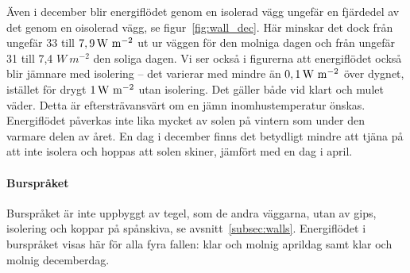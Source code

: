 Även i december blir energiflödet genom en isolerad vägg ungefär en fjärdedel av det 
genom en oisolerad vägg, se figur~\ref{fig:wall_dec}. Här minskar det dock från ungefär 33 
till $\unit[7,9]{W~m^{-2}}$ ut ur väggen för den molniga dagen och från ungefär 31 till 7,4 $\unit{W~m^{-2}}$ den soliga dagen. Vi ser också i figurerna att energiflödet också blir 
jämnare med isolering – det varierar med mindre än $\unit[0,1]{W~m^{-2}}$ över dygnet, 
istället för drygt $\unit[1]{W~m^{-2}}$ utan isolering. Det gäller både vid klart och mulet väder. Detta är eftersträvansvärt om en jämn inomhustemperatur önskas. Energiflödet påverkas inte lika mycket av solen på vintern som under den varmare delen av året. En dag i december finns det betydligt mindre att tjäna på att inte isolera och hoppas att solen skiner, jämfört med en dag i april.

\paragraph{Burspråket}

Burspråket är inte uppbyggt av tegel, som de andra väggarna, utan av gips, isolering och koppar på spånskiva, se avsnitt~\ref{subsec:walls}. Energiflödet i burspråket visas här för alla fyra fallen: klar och molnig aprildag samt klar och molnig decemberdag.

